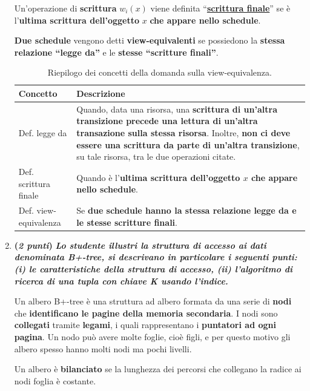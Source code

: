 \documentclass[a4paper]{article}
\newcommand{\dquotes}[1]{``#1''}
\begin{document}
\begin{enumerate}
		Un'operazione di \textbf{scrittura} $w_{i}\left(x\right)$ viene definita \dquotes{\textbf{\underline{scrittura finale}}} se è l'\textbf{ultima scrittura dell'oggetto} $x$ \textbf{che appare nello schedule}.
		
		\textbf{Due schedule} vengono detti \textbf{view-equivalenti} se possiedono la \textbf{stessa relazione \dquotes{legge da}} e le \textbf{stesse \dquotes{scritture finali}}.
		
		\begin{table}[!htp]
			\centering
			\begin{tabular}{@{} l p{21em} @{}}
				\toprule
				Concetto & Descrizione \\
				\midrule
				Def. legge da			& Quando, data una risorsa, una \textbf{scrittura di un'altra transizione precede una lettura di un'altra transazione sulla stessa risorsa}. Inoltre, \textbf{non ci deve essere una scrittura da parte di un'altra transizione}, su tale risorsa, tra le due operazioni citate. \\ [.7em]
				Def. scrittura finale	& Quando è l'\textbf{ultima scrittura dell'oggetto $x$ che appare nello schedule}. \\ [.7em]
				Def. view-equivalenza	& Se \textbf{due schedule hanno la stessa relazione legge da e le stesse scritture finali}. \\
				\bottomrule
			\end{tabular}
			\caption{Riepilogo dei concetti della domanda sulla view-equivalenza.}
		\end{table}\newpage
		
		\item \textbf{(\emph{2 punti})} \textcolor{Green4}{\textbf{\emph{Lo studente illustri la struttura di accesso ai dati denominata B+-tree, si descrivano in particolare i seguenti punti: (i) le caratteristiche della struttura di accesso, (ii) l'algoritmo di ricerca di una tupla con chiave K usando l'indice.}}}\label{dom: B+-tree}
		
		Un albero B+-tree è una struttura ad albero formata da una serie di \textbf{nodi} che \textbf{identificano le pagine della memoria secondaria}. I nodi sono \textbf{collegati} tramite \textbf{legami}, i quali rappresentano i \textbf{puntatori ad ogni pagina}. Un nodo può avere molte foglie, cioè figli, e per questo motivo gli albero spesso hanno molti nodi ma pochi livelli.
		
		Un albero è \textbf{bilanciato} se la lunghezza dei percorsi che collegano la radice ai nodi foglia è costante.
		

\end{enumerate}
\end{document}

